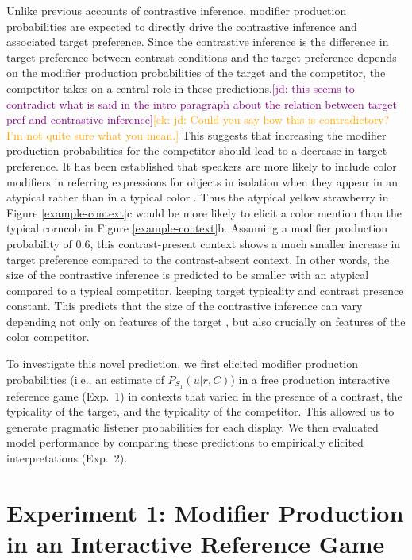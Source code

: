 \documentclass[10pt,letterpaper]{article}
\newcommand{\ek}[1]{\textcolor{Orange}{[ek: #1]}}
\newcommand{\jd}[1]{\textcolor{Purple}{[jd: #1]}}
\newcommand{\figref}[1]{Figure \ref{#1}}
\begin{document}
Unlike previous accounts of contrastive inference, modifier production probabilities are expected to directly drive the contrastive inference and associated target preference. Since the contrastive inference is the difference in target preference between contrast conditions and the target preference depends on the modifier production probabilities of the target and the competitor, the competitor takes on a central role in these predictions.\jd{this seems to contradict what is said in the intro paragraph about the relation between target pref and contrastive inference}\ek{jd: Could you say how this is contradictory? I'm not quite sure what you mean.} This suggests that increasing the modifier production probabilities for the competitor should lead to a decrease in target preference. It has been established that speakers are more likely to include color modifiers in referring expressions for objects in isolation when they appear in an atypical rather than in a typical color \cite{Rubio-Fernandez:2016,Westerbeek:2015,Degen:inpress}. Thus the atypical yellow strawberry in \figref{example-context}c would be more likely to elicit a color mention than the typical corncob in \figref{example-context}b. Assuming a modifier production probability of 0.6, this contrast-present context shows a much smaller increase in target preference compared to the contrast-absent context. In other words, the size of the contrastive inference is predicted to be smaller with an atypical compared to a typical competitor, keeping target typicality and contrast presence constant. This predicts that the size of the contrastive inference can vary depending not only on features of the target \cite<as previously shown by>{Sedivy:2003, Rubio-Fernandez:2019}, but also crucially on features of the color competitor. 


To investigate this novel prediction, we first elicited modifier production probabilities (i.e., an estimate of $P_{S_1}(u|r,C)$) in a free production interactive reference game (Exp.~1) in contexts that varied in the presence of a contrast, the typicality of the target, and the typicality of the competitor. This allowed us to generate pragmatic listener probabilities for each display. We then evaluated model performance by comparing these predictions to empirically elicited interpretations (Exp.~2).


\section{Experiment 1: Modifier Production in an Interactive Reference Game}
\end{document}
